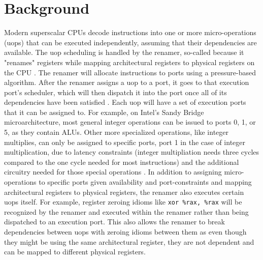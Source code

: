 \documentclass[sigconf]{acmart}
\begin{document}
\section{Background}


Modern superscalar CPUs decode instructions into one or more micro-operations (uops) that can be executed
independently, assuming that their dependencies are available. The uop scheduling is handled by the renamer,
so-called because it "renames" registers while mapping architectural registers to physical registers on the CPU
\cite{abel2022uica} \cite{fog2023architecture}. The renamer will allocate instructions to ports using a pressure-based
algorithm. After the renamer assigns a uop to a port, it goes to that execution port's scheduler, which will then
dispatch it into the port once all of its dependencies have been satisfied \cite{abel2022uica}. Each uop will have a set
of execution ports that it can be assigned to. For example, on Intel's Sandy Bridge microarchitecture, most general
integer operations can be issued to ports 0, 1, or 5, as they contain ALUs. Other more specialized operations, like
integer multiplies, can only be assigned to specific ports, port 1 in the case of integer multiplication, due to
latency constraints (integer multipliation needs three cycles compared to the one cycle needed for most instructions)
and the additional circuitry needed for those special operations \cite{fog2023architecture}. In addition to assigning
micro-operations to specific ports given availability and port-constraints and mapping architectural registers to
physical registers, the renamer also executes certain uops itself. For example, register zeroing idioms like
\texttt{xor \%rax, \%rax} will be recognized by the renamer and executed within the renamer rather than being
dispatched to an execution port. This also allows the renamer to break dependencies between uops with zeroing
idioms between them as even though they might be using the same architectural register, they are not dependent
and can be mapped to different physical registers.
\end{document}
